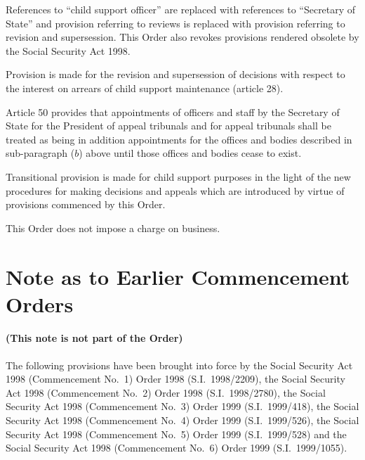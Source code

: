 \documentclass[12pt,a4paper]{article}
\begin{document}
References to “child support officer” are replaced with references to “Secretary of State” and provision referring to reviews is replaced with provision referring to revision and supersession. This Order also revokes provisions rendered obsolete by the Social Security Act 1998.

Provision is made for the revision and supersession of decisions with respect to the interest on arrears of child support maintenance (article 28).

Article 50 provides that appointments of officers and staff by the Secretary of State for the President of appeal tribunals and for appeal tribunals shall be treated as being in addition appointments for the offices and bodies described in sub-paragraph ($b$) above until those offices and bodies cease to exist.

Transitional provision is made for child support purposes in the light of the new procedures for making decisions and appeals which are introduced by virtue of provisions commenced by this Order.

This Order does not impose a charge on business.

\part{Note as to Earlier Commencement Orders}

\renewcommand\parthead{--- Note as to Earlier Commencement Orders}

\subsection*{(This note is not part of the Order)}

The following provisions have been brought into force by the Social Security Act 1998 (Commencement No.\ 1) Order 1998 (S.I.\ 1998/2209), the Social Security Act 1998 (Commencement No.\ 2) Order 1998 (S.I.\ 1998/2780), the Social Security Act 1998 (Commencement No.\ 3) Order 1999 (S.I.\ 1999/418), the Social Security Act 1998 (Commencement No.\ 4) Order 1999 (S.I.\ 1999/526), the Social Security Act 1998 (Commencement No.\ 5) Order 1999 (S.I.\ 1999/528) and the Social Security Act 1998 (Commencement No.\ 6) Order 1999 (S.I.\ 1999/1055).

\medskip
\end{document}
